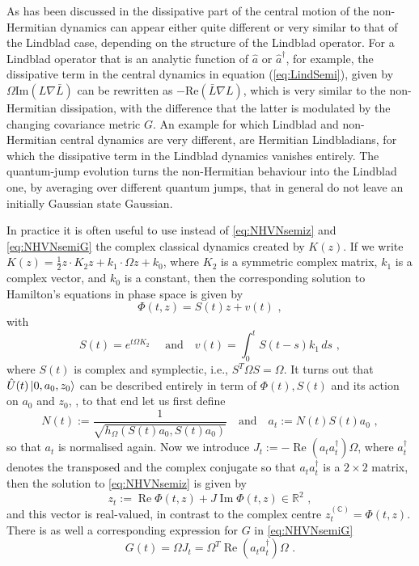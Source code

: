 \documentclass[12pt]{iopart} %
\renewcommand{\Re}{\operatorname{Re}}
\renewcommand{\Im}{\operatorname{Im}}
\begin{document}
As has been discussed in \cite{graefebradley} the dissipative part of the central motion of the non-Hermitian dynamics can appear either quite different or very similar to that of the Lindblad case, depending on the structure of the Lindblad operator. For a Lindblad operator that is an analytic function of $\hat a$ or $\hat a^\dagger$, for example, the dissipative term in the central dynamics in equation (\ref{eq:LindSemi}), given by $\Omega \text{Im} (L \nabla \bar{L})$ can be rewritten as $-\text{Re}(\bar L\nabla L)$, which is very similar to the non-Hermitian dissipation, with the difference that the latter is modulated by the changing covariance metric $G$. An example for which Lindblad and non-Hermitian central dynamics are very different, are Hermitian Lindbladians, for which the dissipative term in the Lindblad dynamics vanishes entirely. The quantum-jump evolution turns the non-Hermitian behaviour into the Lindblad one, by averaging over different quantum jumps, that in general do not leave an initially Gaussian state Gaussian.

In practice it is often useful to use instead of \eqref{eq:NHVNsemiz} and \eqref{eq:NHVNsemiG} the complex classical dynamics created by $K(z)$. If we write  $K(z)=\frac{1}{2}z\cdot K_2z+k_1\cdot \Omega z+k_0$, where $K_2$ is a symmetric complex matrix, $k_1$ is a complex vector, and $k_0$ is a constant, then the corresponding solution to Hamilton's equations in phase space is given by 
\begin{equation}
    \Phi(t,z)=S(t)z+v(t)\,\, ,
\end{equation}
 with 
 \begin{equation}
 S(t)=e^{t\Omega K_2}\,\, \quad\text{and}\quad v(t)=\int_0^tS(t-s) k_1\, d s\,\, ,    
\end{equation}
where  $S(t)$ is complex and symplectic, i.e., $S^T\Omega S=\Omega$. 
It turns out that $\hat U(t)\ket{0,a_0,z_0}$ can be described entirely in term of $\Phi(t), S(t)$ and its action on $a_0$ and $z_0$, \cite{graefe2012complexified,lasser2018non}, to that end  let us first define 
\begin{equation} \label{eq:NDef}
N(t):=\frac{1}{\sqrt{h_{\Omega}(S(t)a_0,S(t)a_0)}} \quad \text{and}\quad a_t:=N(t) S(t) a_0\,\, , 
\end{equation}
so that $a_t$ is normalised again. Now we introduce $J_t:=-\Re(a_ta_t^{\dagger})\Omega$, where $a_t^{\dagger}$ denotes the transposed and the complex conjugate so that $a_t a_t^{\dagger}$ is a $2\times 2$ matrix, then the solution to \eqref{eq:NHVNsemiz} is given by
\begin{equation}
z_t:=\Re \Phi(t,z)+J\Im \Phi(t,z)\in \mathbb{R}^2\,\, ,
\end{equation}
and this vector is real-valued, in contrast to the complex centre $z_t^{(\mathbb{C})}=\Phi(t,z)$. 
There is as well a corresponding expression for $G$ in \eqref{eq:NHVNsemiG} 
\begin{equation} \label{eq:GSol}
    G(t)=\Omega J_t=\Omega^T\Re(a_ta_t^{\dagger})\Omega\,\, .
\end{equation}
\end{document}
